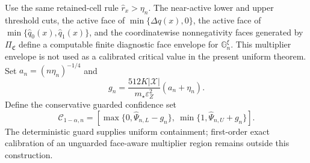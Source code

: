 Use the same retained-cell rule \(\widehat r_x>\eta_n\).  The near-active lower and upper threshold cuts, the active face of \(\min\{\widehat{\Delta q}(x),0\}\), the active face of \(\min\{\widehat q_0(x),\widehat q_1(x)\}\), and the coordinatewise nonnegativity faces generated by \(\Pi_{\mathfrak C}\) define a computable finite diagnostic face envelope for \(\mathbb G_n^\xi\).  This multiplier envelope is not used as a calibrated critical value in the present uniform theorem.  Set \(a_n=(n\eta_n)^{-1/4}\) and
\[
g_n=\frac{512K|\mathcal X|}{m_{\star}\varepsilon_Z^2}(a_n+\eta_n).
\]
Define the conservative guarded confidence set
\[
\mathcal C_{1-\alpha,n}=
\left[\max\{0,\widehat\Psi_{n,L}-g_n\},\ \min\{1,\widehat\Psi_{n,U}+g_n\}\right].
\]
The deterministic guard supplies uniform containment; first-order exact calibration of an unguarded face-aware multiplier region remains outside this construction.
